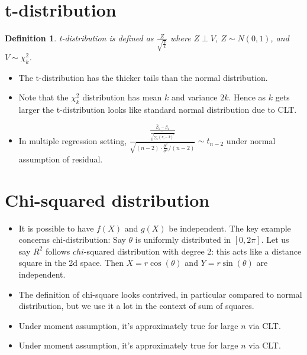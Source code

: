 \documentclass[11pt,reqno]{amsart}
\newtheorem{definition}{Definition}
\theoremstyle{remark}
\begin{document}
\section{t-distribution}
\begin{definition}
t-distribution is defined as $\frac Z{\sqrt{\frac Vk}}$ where $Z \perp V$, $Z\sim N(0,1)$, and $V\sim \chi_k^2$.
\end{definition}
\begin{itemize}
\item The t-distribution has the thicker tails than the normal distribution.
\item Note that the $\chi_k^2$ distribution has mean $k$ and variance $2k$. Hence as $k$ gets larger the t-distribution 
looks like standard normal distribution due to CLT. 
\item In multiple regression setting, $\frac{\frac{\hat\beta_1-\beta_1}{\frac \sigma{\sqrt{\sum_i(X_i-\bar X)^2}}}}
{\sqrt{(n-2)\cdot\frac{\hat \sigma^2}{\sigma^2}/(n-2)}}\sim t_{n-2}$ under normal assumption of residual.
\end{itemize}

\section{Chi-squared distribution}
\begin{itemize}
\item It is possible to have $f(X)$ and $g(X)$ be independent. The key example concerns chi-distribution: Say $\theta$ is uniformly distributed in $[0,2\pi]$. 
Let us say $R^2$ follows $chi$-squared distribution with degree 2: this acts like a distance square in the 2d space. Then $X= r\cos(\theta)$ and $Y=r\sin(\theta)$ are independent.
\item The definition of chi-square looks contrived, in particular compared to normal distribution, but we use it a lot in the context of sum of squares.
\item Under moment assumption, it's approximately true for large $n$ via CLT.
\item Under moment assumption, it's approximately true for large $n$ via CLT.
\end{itemize}
\end{document}
